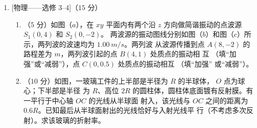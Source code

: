 \begin{enumerate}
\newpage
\item 

[物理——选修 $ 3 $–$ 4 $]（$ 15 $ 分）
\begin{enumerate}
\renewcommand{\labelenumi}{\arabic{enumi}.}
\item
（$ 5 $ 分）如图（$ a $），在 $ xy $ 平面内有两个沿 $ z $ 方向做简谐振动的点波源 $ S_{1}(0,4) $ 和 $ S_{2}(0,-2) $。
两波源的振动图线分别如图（$ b $）和图（$ c $）所示，两列波的波速均为 $ 1.00 \ m/s $。两列波
从波源传播到点 $ A(8,-2) $ 的路程差为  $ m $，两列波引起的点 $ B(4,1) $ 处质点的振动相
互  （填“加强”或“减弱”），点 $ C(0,0.5) $ 处质点的振动相互  （填“加强”
或“减弱”）。
\begin{figure}[h!]
\centering

\end{figure}

\item 
（$ 10 $ 分）如图，一玻璃工件的上半部是半径为 $ R $ 的半球体， $ O $ 点为球心；下半部是半径
为 $ R $、高位 $ 2R $ 的圆柱体，圆柱体底面镀有反射膜。有一平行于中心轴 $ OC $ 的光线从半球面
射入，该光线与 $ OC $ 之间的距离为 $ 0.6R $。已知最后从半球面射出的光线恰好与入射光线平
行（不考虑多次反射）。求该玻璃的折射率。
\begin{figure}[h!]
\flushright

\end{figure}



\end{enumerate}





\end{enumerate}






